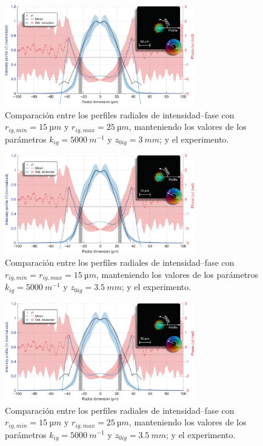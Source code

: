 \begin{figure}[htbp]
  \centering
  \includegraphics[width=0.74\textwidth]{Figuras/anx_cmp_66.png}
  \caption*{Comparación entre los perfiles radiales de intensidad--fase con $r_{ig,min}=\qty{15}{µm}$ y $r_{ig,max}=\qty{25}{µm}$, manteniendo los valores de los parámetros $k_{ig}=\qty{5000}{m^{-1}}$ y $z_{0ig}=\qty{3}{mm}$; y el experimento.}
\end{figure}

\begin{figure}[htbp]
  \centering
  \includegraphics[width=0.74\textwidth]{Figuras/anx_cmp_67.png}
  \caption*{Comparación entre los perfiles radiales de intensidad--fase con $r_{ig,min}=r_{ig,max}=\qty{15}{µm}$, manteniendo los valores de los parámetros $k_{ig}=\qty{5000}{m^{-1}}$ y $z_{0ig}=\qty{3.5}{mm}$; y el experimento.}
\end{figure}

\begin{figure}[htbp]
  \centering
  \includegraphics[width=0.74\textwidth]{Figuras/anx_cmp_68.png}
  \caption*{Comparación entre los perfiles radiales de intensidad--fase con $r_{ig,min}=\qty{15}{µm}$ y $r_{ig,max}=\qty{25}{µm}$, manteniendo los valores de los parámetros $k_{ig}=\qty{5000}{m^{-1}}$ y $z_{0ig}=\qty{3.5}{mm}$; y el experimento.}
\end{figure}


